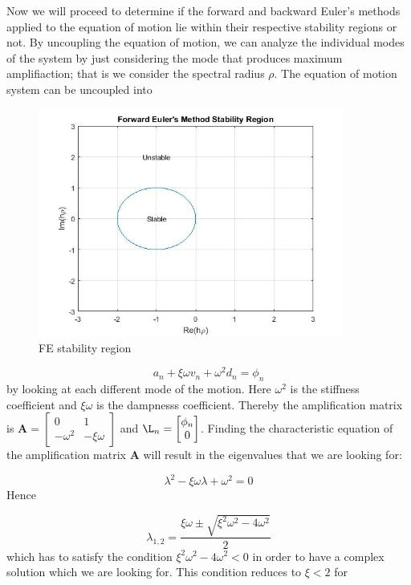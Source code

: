\documentclass{article}
\begin{document}
Now we will proceed to determine if the forward and backward Euler's methods applied to the equation of motion lie within their respective stability regions or not. By uncoupling the equation of motion, we can analyze the individual modes of the system by just considering the mode that produces maximum amplifiaction; that is we consider the spectral radius $\rho$. The equation of motion system can be uncoupled into 
				\begin{figure}[h!]
   					\centering
   					\includegraphics[width=100mm]{pictures/GraphEulerF.jpg}
					\centering
   					\caption{FE stability region}
				           \label{fig5}
  				\end{figure}

				\begin{equation}
					a_n + \xi\omega v_n + \omega^2 d_n = \phi_n
				\end{equation}
by looking at each different mode of the motion. Here $\omega^2$ is the stiffness coefficient and $\xi \omega$ is the dampnesss coefficient.
Thereby the amplification matrix is $\textbf{A} = \begin{bmatrix}0 & 1 \\ -\omega^2 & -\xi\omega \end{bmatrix}$ and $\L_n = \begin{bmatrix}\phi_n \\ 0 \end{bmatrix}$. Finding the characteristic equation of the amplification matrix $\textbf{A}$ will result in the eigenvalues that we are looking for:

				\begin{equation}
					\lambda^2 -\xi\omega\lambda + \omega^2 = 0
				\end{equation}
Hence 

				\begin{equation}
					\lambda_{1,2} = \frac{\xi\omega \pm \sqrt{\xi^2\omega^2 - 4\omega^2}}{2}
				\end{equation}
which has to satisfy the condition $\xi^2\omega^2-4\omega^2 < 0$ in order to have a complex solution which we are looking for. This condition reduces to $\xi < 2$ for
\end{document}

